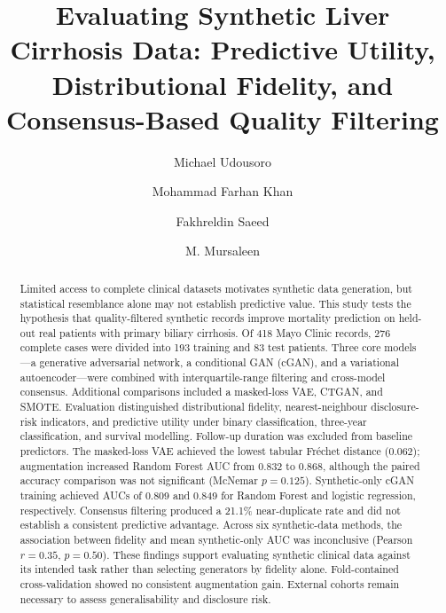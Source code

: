 \documentclass[manuscript,review,screen,nonacm]{acmart}
\newif\ifshowrevisions
\DeclareRobustCommand{\rev}[1]{\ifshowrevisions{\color{revisionblue}#1}\else#1\fi}
\begin{document}
\title[Synthetic Liver Cirrhosis Data: Utility and Quality]{\rev{Evaluating Synthetic Liver Cirrhosis Data: Predictive Utility, Distributional Fidelity, and Consensus-Based Quality Filtering}}
\author{Michael Udousoro}
\author{Mohammad Farhan Khan}
\author{Fakhreldin Saeed}
\author{M. Mursaleen}
\renewcommand{\shortauthors}{Udousoro et al.}
\begin{abstract}
\rev{Limited access to complete clinical datasets motivates synthetic data generation, but statistical resemblance alone may not establish predictive value. This study tests the hypothesis that quality-filtered synthetic records improve mortality prediction on held-out real patients with primary biliary cirrhosis. Of 418 Mayo Clinic records, 276 complete cases were divided into 193 training and 83 test patients. Three core models---a generative adversarial network, a conditional GAN (cGAN), and a variational autoencoder---were combined with interquartile-range filtering and cross-model consensus. Additional comparisons included a masked-loss VAE, CTGAN, and SMOTE. Evaluation distinguished distributional fidelity, nearest-neighbour disclosure-risk indicators, and predictive utility under binary classification, three-year classification, and survival modelling. Follow-up duration was excluded from baseline predictors. The masked-loss VAE achieved the lowest tabular Fr\'{e}chet distance (0.062); augmentation increased Random Forest AUC from 0.832 to 0.868, although the paired accuracy comparison was not significant (McNemar $p=0.125$). Synthetic-only cGAN training achieved AUCs of 0.809 and 0.849 for Random Forest and logistic regression, respectively. Consensus filtering produced a 21.1\% near-duplicate rate and did not establish a consistent predictive advantage. Across six synthetic-data methods, the association between fidelity and mean synthetic-only AUC was inconclusive (Pearson $r=0.35$, $p=0.50$). These findings support evaluating synthetic clinical data against its intended task rather than selecting generators by fidelity alone. Fold-contained cross-validation showed no consistent augmentation gain. External cohorts remain necessary to assess generalisability and disclosure risk.}
\end{abstract}
\end{document}

